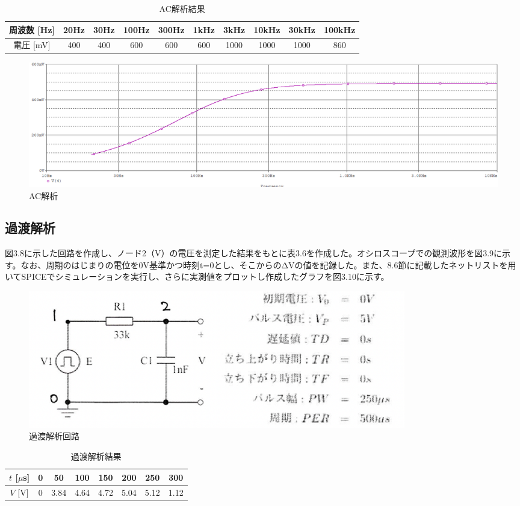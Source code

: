 \documentclass{jlreq}
\numberwithin{equation}{section}
\begin{document}
\begin{table}[H]
  \centering
    \caption{AC解析結果}
    \begin{tabular}{|c|c|c|c|c|c|c|c|c|c|}
      \hline
      周波数 [Hz] & 20Hz & 30Hz & 100Hz & 300Hz & 1kHz & 3kHz & 10kHz & 30kHz & 100kHz \\ \hline
      電圧 [mV] & 400 & 400 & 600 & 600 & 600 & 1000 & 1000 & 1000 & 860 \\ \hline
    \end{tabular}
\end{table}

\begin{figure}[H]
  \centering
  \includegraphics[width=\textwidth]{assets/ackaisekiplot.png}
  \caption{AC解析}
\end{figure}

\subsection{過渡解析}
図3.8に示した回路を作成し、ノード2（V）の電圧を測定した結果をもとに表3.6を作成した。オシロスコープでの観測波形を図3.9に示す。なお、周期のはじまりの電位を0V基準かつ時刻t=0とし、そこからのΔVの値を記録した。また、8.6節に記載したネットリストを用いてSPICEでシミュレーションを実行し、さらに実測値をプロットし作成したグラフを図3.10に示す。

\begin{figure}[H]
  \centering
  \includegraphics[width=0.8\textwidth]{assets/katokaisekikairo.png}
  \caption{過渡解析回路}
\end{figure}

\begin{table}[H]
  \centering
  \caption{過渡解析結果}
  \begin{tabular}{|c|c|c|c|c|c|c|c|}
    \hline
    \( t \) [\(\mu\)s] & 0 & 50 & 100 & 150 & 200 & 250 & 300 \\ \hline
    \( V \) [V] & 0 & 3.84 & 4.64 & 4.72 & 5.04 & 5.12 & 1.12 \\ \hline
  \end{tabular}
\end{table}
\end{document}
